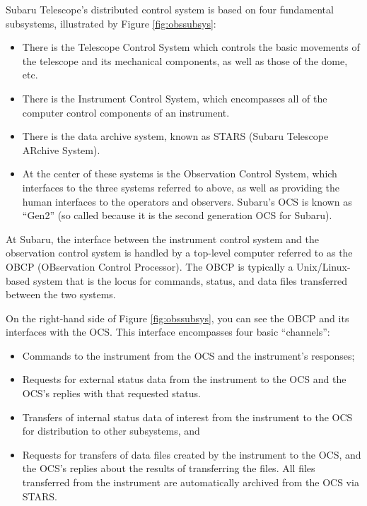 \documentclass[11pt]{report}
\begin{document}
Subaru Telescope's distributed control system is based on four
fundamental subsystems, illustrated by Figure \ref{fig:obssubsys}: 
\begin{itemize}
\item There is the Telescope Control System which controls the basic
movements of the telescope and its mechanical components, as well as
those of the dome, etc. 

\item There is the Instrument Control System, which encompasses all of
the computer control components of an instrument. 

\item There is the data archive system, known as STARS (Subaru Telescope
ARchive System). 

\item At the center of these systems is the Observation Control System,
which interfaces to the three systems referred to above, as well as
providing the human interfaces to the operators and observers. Subaru's
OCS is known as ``Gen2'' (so called because it is the second generation
OCS for Subaru).  
\end{itemize}

At Subaru, the interface between the instrument control system and the
observation control system is handled by a top-level computer referred
to as the OBCP (OBservation Control Processor). The OBCP is typically a
Unix/Linux-based system that is the locus for commands, status, and data
files transferred between the two systems. 

On the right-hand side of Figure \ref{fig:obssubsys}, you can see the
OBCP and its interfaces with the OCS. This interface encompasses four
basic ``channels'': 
\begin{itemize}
\item Commands to the instrument from the OCS and the instrument's responses;

\item Requests for external status data from the instrument to the OCS
and the OCS's replies with that requested status. 

\item Transfers of internal status data of interest from the instrument
to the OCS for distribution to other subsystems, and 

\item Requests for transfers of data files created by the instrument to
the OCS, and the OCS's replies about the results of transferring the
files. All files transferred from the instrument are automatically
archived from the OCS via STARS. 
\end{itemize}
\end{document}
